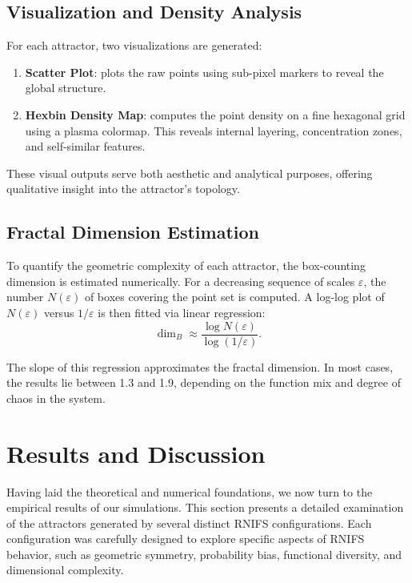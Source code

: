 \documentclass[twocolumn,10pt]{article}
\begin{document}
\subsection{Visualization and Density Analysis}
\label{subsec:visualization}

For each attractor, two visualizations are generated:
\begin{enumerate}
  \item \textbf{Scatter Plot}: plots the raw points using sub-pixel markers to reveal the global structure.
  \item \textbf{Hexbin Density Map}: computes the point density on a fine hexagonal grid using a plasma colormap. This reveals internal layering, concentration zones, and self-similar features.
\end{enumerate}

These visual outputs serve both aesthetic and analytical purposes, offering qualitative insight into the attractor's topology.

\subsection{Fractal Dimension Estimation}
\label{subsec:dimension_estimation}

To quantify the geometric complexity of each attractor, the box-counting dimension is estimated numerically. For a decreasing sequence of scales $\varepsilon$, the number $N(\varepsilon)$ of boxes covering the point set is computed. A log-log plot of $N(\varepsilon)$ versus $1/\varepsilon$ is then fitted via linear regression:
\[
\dim_B \approx \frac{\log N(\varepsilon)}{\log(1/\varepsilon)}.
\]

The slope of this regression approximates the fractal dimension. In most cases, the results lie between 1.3 and 1.9, depending on the function mix and degree of chaos in the system.

\section{Results and Discussion}
\label{sec:results}
\vspace{0.9em}
Having laid the theoretical and numerical foundations, we now turn to the empirical results of our simulations. This section presents a detailed examination of the attractors generated by several distinct RNIFS configurations. Each configuration was carefully designed to explore specific aspects of RNIFS behavior, such as geometric symmetry, probability bias, functional diversity, and dimensional complexity.
\end{document}
